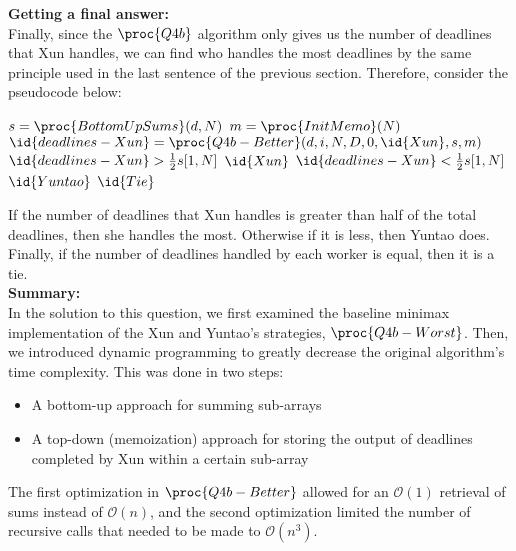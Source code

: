     \textbf{Getting a final answer:}\\
    Finally, since the $\proc{Q4b}$ algorithm only gives us the number of deadlines that Xun handles, we can find who handles the most deadlines by the same principle used in the last sentence of the previous section.
    Therefore, consider the pseudocode below:

    \begin{spacing}{1.2}
        \begin{codebox}
            \li $s = \proc{BottomUpSums}(d, N)$
            \li $m = \proc{InitMemo}(N)$
            \li $\id{deadlines-Xun} = \proc{Q4b-Better}(d, i, N, D, 0, \id{Xun}, s, m)$
            \li \If $\id{deadlines-Xun} > {1 \over 2}s[1, N]$
                \Then
                    \li \Return $\id{Xun}$
                \li \ElseIf $\id{deadlines-Xun} < {1 \over 2}s[1, N]$
                \Then
                    \li \Return $\id{Yuntao}$
                \li \Else
                    \li \Return $\id{Tie}$
                \End
        \end{codebox}
    \end{spacing}
    \vspace{5mm}
    If the number of deadlines that Xun handles is greater than half of the total deadlines, then she handles the most.
    Otherwise if it is less, then Yuntao does.
    Finally, if the number of deadlines handled by each worker is equal, then it is a tie.\\

    \textbf{Summary:}\\
    In the solution to this question, we first examined the baseline minimax implementation of the Xun and Yuntao's strategies, $\proc{Q4b-Worst}$.
    Then, we introduced dynamic programming to greatly decrease the original algorithm's time complexity.
    This was done in two steps:
    \begin{spacing}{1}
    \begin{itemize}
        \item A bottom-up approach for summing sub-arrays
        \item A top-down (memoization) approach for storing the output of deadlines completed by Xun within a certain sub-array
    \end{itemize}
    \end{spacing}

    The first optimization in $\proc{Q4b-Better}$ allowed for an $\mathcal{O}(1)$ retrieval of sums instead of $\mathcal{O}(n)$, and the second optimization limited the number of recursive calls that needed to be made to $\mathcal{O}(n^3)$.